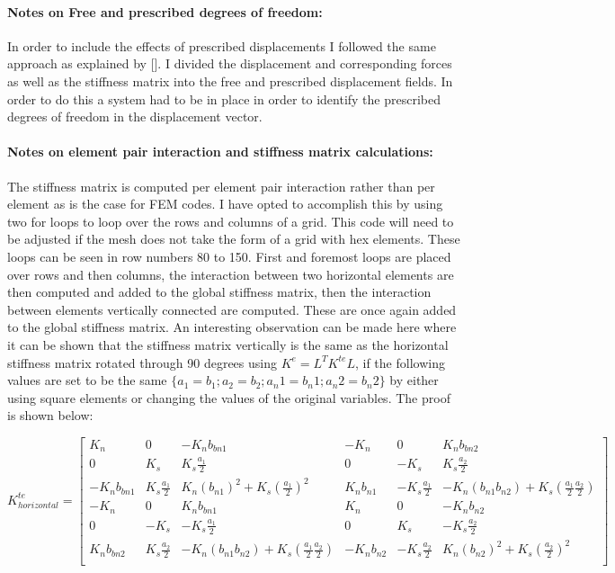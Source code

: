 \paragraph{Notes on Free and prescribed degrees of freedom:}  In order to include the effects of prescribed displacements I followed the same approach as explained by [\cite{fem_sum}].  I divided the displacement and corresponding forces as well as the stiffness matrix into the free and prescribed displacement fields.  In order to do this a system had to be in place in order to identify the prescribed degrees of freedom in the displacement vector. 

\paragraph{Notes on element pair interaction and stiffness matrix calculations:}
The stiffness matrix is computed per element pair interaction rather than per element as is the case for FEM codes.  I have opted to accomplish this by using two for loops to loop over the rows and columns of a grid.  This code will need to be adjusted if the mesh does not take the form of a grid with hex elements.  These loops can be seen in row numbers 80 to 150.  First and foremost loops are placed over rows and then columns, the interaction between two horizontal elements are then computed and added to the global stiffness matrix, then the interaction between elements vertically connected are computed.  These are once again added to the global stiffness matrix.  An interesting observation can be made here where it can be shown that the stiffness matrix vertically is the same as the horizontal stiffness matrix rotated through 90 degrees using $K^e = L^T K^{te} L$, if the following values are set to be the same $\{a_1 = b_1; a_2 = b_2; a_n1 = b_n1;a_n2 = b_n2\}$ by either using square elements or changing the values of the original variables.  The proof is shown below:

\begin{equation}
K^{te}_{horizontal} = 
\begin{bmatrix}
K_n & 0 & -K_n b_{bn1} & -K_n & 0 & K_n b_{bn2} \\

0 & K_s & K_s \frac{a_1}{2} & 0 & -K_s & K_s \frac{a_2}{2} \\

-K_n b_{bn1} & K_s \frac{a_1}{2} & K_n (b_{n1})^2 + K_s (\frac{a_1}{2})^2 & K_n b_{n1} & -K_s \frac{a_1}{2} & -K_n (b_{n1} b_{n2}) + K_s (\frac{a_1}{2} \frac{a_2}{2}) \\

-K_n & 0 & K_n b_{bn1} & K_n & 0 & -K_n b_{n2}  \\

0 & -K_s & -K_s \frac{a_1}{2}& 0 & K_s & -K_s \frac{a_2}{2} \\

K_n b_{bn2} & K_s \frac{a_2}{2} & -K_n (b_{n1} b_{n2}) + K_s (\frac{a_1}{2} \frac{a_2}{2}) & -K_n b_{n2} & -K_s \frac{a_2}{2} & K_n (b_{n2})^2 + K_s (\frac{a_2}{2})^2 \\
\end{bmatrix}
\label{eq:Kte horizon}
\end{equation}

